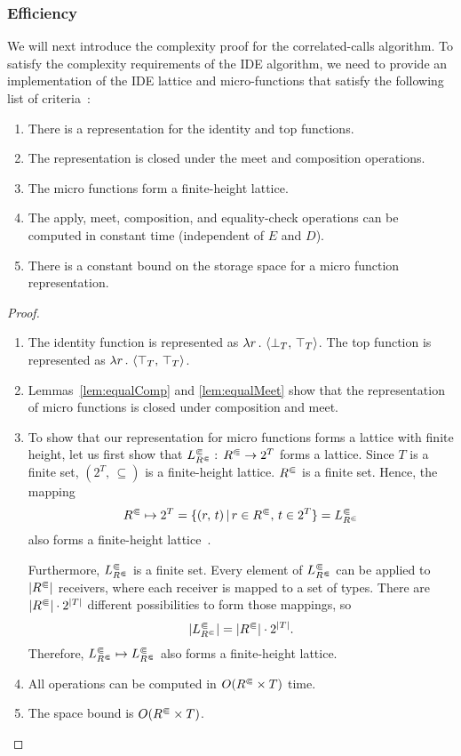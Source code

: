 \subsubsection{Efficiency}
We will next introduce the complexity proof for the correlated-calls algorithm.
To satisfy the complexity requirements of the IDE algorithm, we need to provide
an implementation of the IDE lattice and micro-functions that satisfy the following
list of criteria~\cite{sagiv1996precise}:
\begin{enumerate}
	\item There is a representation for the identity and top functions.
  \item The representation is closed under the meet and composition operations.
  \item The micro functions form a finite-height lattice.
  \item The apply, meet, composition, and equality-check operations can be computed in constant time (independent of $E$ and $D$).
  \item There is a constant bound on the storage space for a micro function representation.
\end{enumerate}
\efficient*
\begin{proof}
\leavevmode
  \begin{enumerate}
    \item The identity function is represented as $\lambda r\,.\,\left\langle \bot_T,\,\top_T\right\rangle$. 
    The top function is represented as $\lambda r\,.\,\left\langle \top_T,\,\top_T\right\rangle$.
    \item Lemmas~\ref{lem:equalComp} and \ref{lem:equalMeet} show that the representation of micro functions is closed under composition and meet.
    \item To show that our representation for micro functions forms a lattice with finite height, let us first show that $L^\Subset_{R^\Subset}:\,{R^\Subset}\to2^T$ forms a lattice. Since $T$ is a finite set, $(2^T,\,\subseteq)$ is a finite-height lattice. ${R^\Subset}$ is a finite set. Hence, the mapping
    \[
      {R^\Subset}\mapsto2^T=\{(r,\,t)\,|\,r\in {R^\Subset},\,t\in 2^T\}=L^\Subset_{R^\Subset}
    \]        
    also forms a finite-height lattice~\cite{nielson1999principles}. 
    
    Furthermore, $L^\Subset_{R^\Subset}$ is a finite set. 
    Every element of $L^\Subset_{R^\Subset}$ can be applied to $|{R^\Subset}|$ receivers, where each receiver is mapped to a set of types. There are $|{R^\Subset}|\cdot2^{|T|}$ different possibilities to form those mappings, so
    \[
      |L^\Subset_{R^\Subset}|=|{R^\Subset}|\cdot2^{|T|}.
    \]
    Therefore, $L^\Subset_{R^\Subset}\mapsto L^\Subset_{R^\Subset}$ also forms a finite-height lattice.
    \item All operations can be computed in $O({R^\Subset}\times T)$ time. %
    \item The space bound is $O({R^\Subset}\times T)$.\qedhere
  \end{enumerate}
\end{proof}

